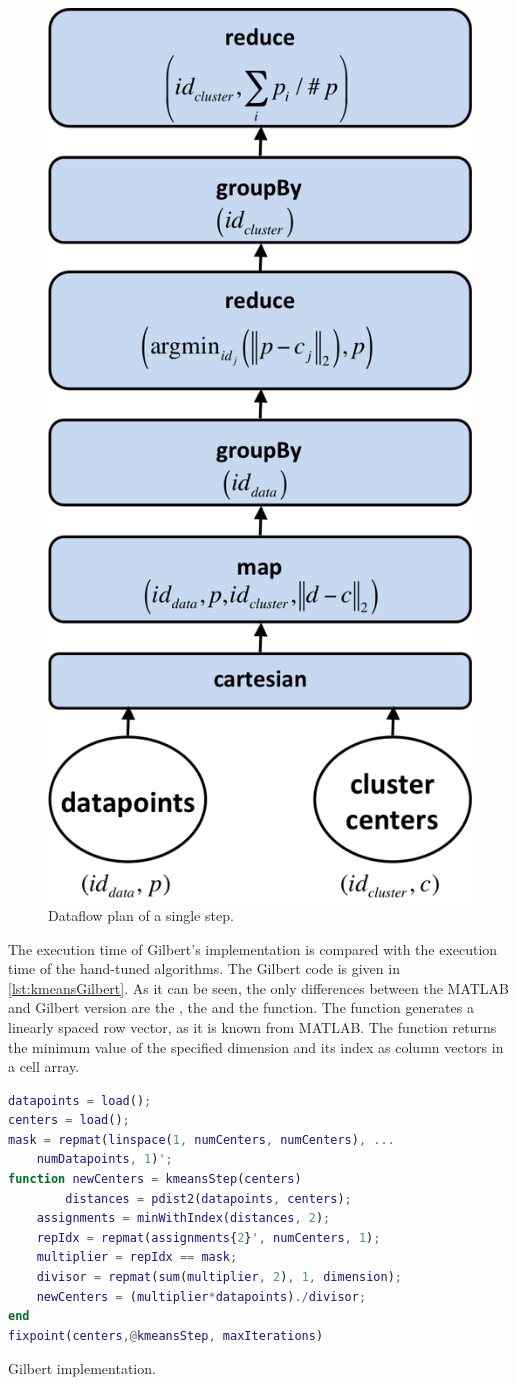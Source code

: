 \begin{figure}
	\centering
	\includegraphics[width=0.3\linewidth]{images/kmeansStep.png}
	\caption{Dataflow plan of a single \kmeans step.}
	\label{fig:kmeansDataflow}
\end{figure}

The execution time of Gilbert's \kmeans implementation is compared with the execution time of the hand-tuned algorithms.
The Gilbert code is given in \cref{lst:kmeansGilbert}.
As it can be seen, the only differences between the MATLAB and Gilbert version are the , the  and the  function.
The  function generates a linearly spaced row vector, as it is known from MATLAB.
The  function returns the minimum value of the specified dimension and its index as column vectors in a cell array.

\begin{listing}
	\begin{CenteredBox}
		\begin{lstlisting}[language=Matlab,
		commentstyle=\color{black},
		  stringstyle=\color{black},
		  keywordstyle=\color{black}\bfseries,
		  morekeywords={repmat, pdist2, minWithIndex, fixpoint}
		  ]
datapoints = load();
centers = load();
mask = repmat(linspace(1, numCenters, numCenters), ...
	numDatapoints, 1)';
function newCenters = kmeansStep(centers)
		distances = pdist2(datapoints, centers);
  	assignments = minWithIndex(distances, 2);
  	repIdx = repmat(assignments{2}', numCenters, 1);
  	multiplier = repIdx == mask;
  	divisor = repmat(sum(multiplier, 2), 1, dimension);
  	newCenters = (multiplier*datapoints)./divisor;
end
fixpoint(centers,@kmeansStep, maxIterations)
		\end{lstlisting}
	\end{CenteredBox}
	\caption{Gilbert \kmeans implementation.}
	\label{lst:kmeansGilbert}
\end{listing}

